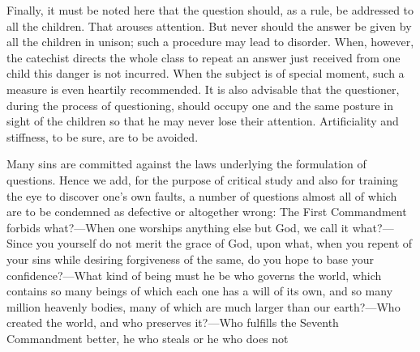Finally, it must be noted here that the question should, as a rule, be addressed to all the children. That arouses attention. But never should the answer be given by all the children in unison; such a procedure may lead to disorder. When, however, the catechist directs the whole class to repeat an answer just received from one child this danger is not incurred. When the subject is of special moment, such a measure is even heartily recommended. It is also advisable that the questioner, during the process of questioning, should occupy one and the same posture in sight of the children so that he may never lose their attention. Artificiality and stiffness, to be sure, are to be avoided.

Many sins are committed against the laws underlying the formulation of questions. Hence we add, for the purpose of critical study and also for training the eye to discover one’s own faults, a number of questions almost all of which are to be condemned as defective or altogether wrong: The First Commandment forbids what?—When one worships anything else but God, we call it what?—Since you yourself do not merit the grace of God, upon what, when you repent of your sins while desiring forgiveness of the same, do you hope to base your confidence?—What kind of being must he be who governs the world, which contains so many beings of which each one has a will of its own, and so many million heavenly bodies, many of which are much larger than our earth?—Who created the world, and who preserves it?—Who fulfills the Seventh Commandment better, he who steals or he who does not
